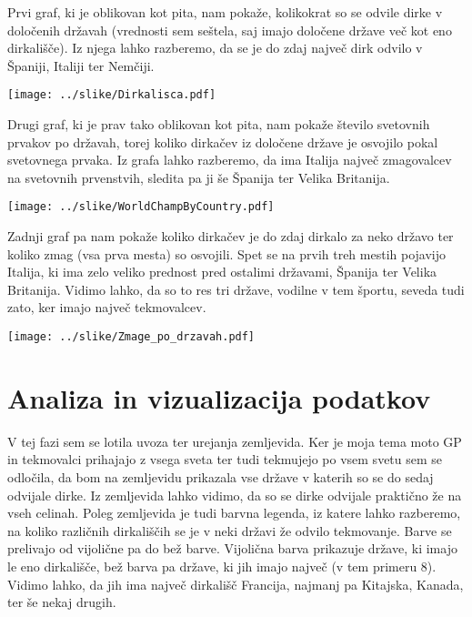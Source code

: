 \documentclass[11pt,a4paper]{article}
\begin{document}
\bigskip

Prvi graf, ki je oblikovan kot pita, nam pokaže, kolikokrat so se odvile dirke v določenih državah (vrednosti sem seštela, saj imajo določene države več kot eno dirkališče). Iz njega lahko razberemo, da se je do zdaj največ dirk odvilo v Španiji, Italiji ter Nemčiji. 

\texttt{[image: ../slike/Dirkalisca.pdf]}

\newpage
Drugi graf, ki je prav tako oblikovan kot pita, nam pokaže število svetovnih prvakov po državah, torej koliko dirkačev iz določene države je osvojilo pokal svetovnega prvaka. Iz grafa lahko razberemo, da ima Italija največ zmagovalcev na svetovnih prvenstvih, sledita pa ji še Španija ter Velika Britanija. 

\texttt{[image: ../slike/WorldChampByCountry.pdf]}

\newpage
Zadnji graf pa nam pokaže koliko dirkačev je do zdaj dirkalo za neko državo ter koliko zmag (vsa prva mesta) so osvojili. Spet se na prvih treh mestih pojavijo Italija, ki ima zelo veliko prednost pred ostalimi državami, Španija ter Velika Britanija. Vidimo lahko, da so to res tri države, vodilne v tem športu, seveda tudi zato, ker imajo največ tekmovalcev. 

\texttt{[image: ../slike/Zmage\_po\_drzavah.pdf]}

\newpage
\section{Analiza in vizualizacija podatkov}

V tej fazi sem se lotila uvoza ter urejanja zemljevida. Ker je moja tema moto GP in tekmovalci prihajajo z vsega sveta ter tudi tekmujejo po vsem svetu sem se odločila, da bom na zemljevidu prikazala vse države v katerih so se do sedaj odvijale dirke. 
Iz zemljevida lahko vidimo, da so se dirke odvijale praktično že na vseh celinah. Poleg zemljevida je tudi barvna legenda, iz katere lahko razberemo, na koliko različnih dirkališčih se je v neki državi že odvilo tekmovanje. Barve se prelivajo od vijolične pa do bež barve. Vijolična barva prikazuje države, ki imajo le eno dirkališče, bež barva pa države, ki jih imajo največ (v tem primeru 8). Vidimo lahko, da jih ima največ dirkališč Francija, najmanj pa Kitajska, Kanada, ter še nekaj drugih.   

\end{document}

